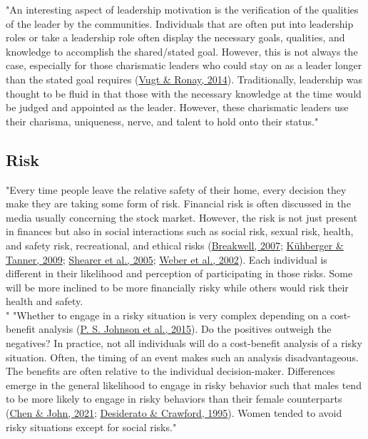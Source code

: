 \documentclass[
"  donotrepeattitle,doc, 12pt, a4paper,floatsintext]{apa7}"
\begin{document}
"An interesting aspect of leadership motivation is the verification of the qualities of the leader by the communities. Individuals that are often put into leadership roles or take a leadership role often display the necessary goals, qualities, and knowledge to accomplish the shared/stated goal. However, this is not always the case, especially for those charismatic leaders who could stay on as a leader longer than the stated goal requires (\protect\hyperlink{ref-vugt2014}{Vugt \& Ronay, 2014}). Traditionally, leadership was thought to be fluid in that those with the necessary knowledge at the time would be judged and appointed as the leader. However, these charismatic leaders use their charisma, uniqueness, nerve, and talent to hold onto their status."
\hypertarget{risk}{%
\subsection{Risk}\label{risk}}
"Every time people leave the relative safety of their home, every decision they make they are taking some form of risk. Financial risk is often discussed in the media usually concerning the stock market. However, the risk is not just present in finances but also in social interactions such as social risk, sexual risk, health, and safety risk, recreational, and ethical risks (\protect\hyperlink{ref-breakwell2007}{Breakwell, 2007}; \protect\hyperlink{ref-kuhberger2009}{Kühberger \& Tanner, 2009}; \protect\hyperlink{ref-shearer2005}{Shearer et al., 2005}; \protect\hyperlink{ref-weber2002}{Weber et al., 2002}). Each individual is different in their likelihood and perception of participating in those risks. Some will be more inclined to be more financially risky while others would risk their health and safety.\\"
"Whether to engage in a risky situation is very complex depending on a cost-benefit analysis (\protect\hyperlink{ref-johnson2015a}{P. S. Johnson et al., 2015}). Do the positives outweigh the negatives? In practice, not all individuals will do a cost-benefit analysis of a risky situation. Often, the timing of an event makes such an analysis disadvantageous. The benefits are often relative to the individual decision-maker. Differences emerge in the general likelihood to engage in risky behavior such that males tend to be more likely to engage in risky behaviors than their female counterparts (\protect\hyperlink{ref-chen2021}{Chen \& John, 2021}; \protect\hyperlink{ref-desiderato1995}{Desiderato \& Crawford, 1995}). Women tended to avoid risky situations except for social risks."
\end{document}
